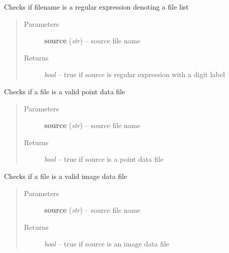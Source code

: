 \documentclass[letterpaper,10pt,english]{sphinxmanual}
\begin{document}

\begin{fulllineitems}
\label{api/ClearMap.IO:ClearMap.IO.IO.isFileExpression}
Checks if filename is a regular expression denoting a file list
\begin{quote}\begin{description}
\item[{Parameters}] \leavevmode
\textbf{source} (\emph{str}) --
source file name

\item[{Returns}] \leavevmode
\emph{bool} --
true if source is regular expression with a digit label

\end{description}\end{quote}

\end{fulllineitems}


\begin{fulllineitems}
\label{api/ClearMap.IO:ClearMap.IO.IO.isPointFile}
Checks if a file is a valid point data file
\begin{quote}\begin{description}
\item[{Parameters}] \leavevmode
\textbf{source} (\emph{str}) --
source file name

\item[{Returns}] \leavevmode
\emph{bool} --
true if source is a point data file

\end{description}\end{quote}

\end{fulllineitems}


\begin{fulllineitems}
\label{api/ClearMap.IO:ClearMap.IO.IO.isDataFile}
Checks if a file is a valid image data file
\begin{quote}\begin{description}
\item[{Parameters}] \leavevmode
\textbf{source} (\emph{str}) --
source file name

\item[{Returns}] \leavevmode
\emph{bool} --
true if source is an image data file

\end{description}\end{quote}

\end{fulllineitems}
\end{document}
